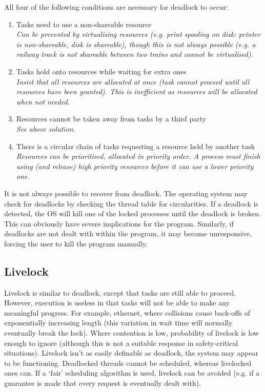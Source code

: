 \documentclass[a4paper,oneside]{report}
\begin{document}
    	\noindent All four of the following conditions are necessary for deadlock to occur: 
    	\begin{enumerate}
    		\item Tasks need to use a non-shareable resource\\ 
    			  \emph{Can be prevented by virtualising resources (e.g. print spooling on disk: printer is non-shareable, disk is shareable), though this is not always possible (e.g. a railway track is not shareable between two trains and cannot be virtualised).}
    		\item Tasks hold onto resources while waiting for extra ones\\
    			  \emph{Insist that all resources are allocated at once (task cannot proceed until all resources have been granted). This is inefficient as resources will be allocated when not needed.}
    		\item Resources cannot be taken away from tasks by a third party\\
    			  \emph{See above solution.}
    		\item There is a circular chain of tasks requesting a resource held by another task\\
    			  \emph{Resources can be prioritised, allocated in priority order. A process must finish using (and release) high priority resources before it can use a lower priority one.}
    	\end{enumerate}
    	
    	It is not always possible to recover from deadlock. The operating system may check for deadlocks by checking the thread table for circularities. If a deadlock is detected, the OS will kill one of the locked processes until the deadlock is broken. This can obviously have severe implications for the program. Similarly, if deadlocks are not dealt with within the program, it may become unresponsive, forcing the user to kill the program manually.
    	
    	\subsection{Livelock}
    	Livelock is similar to deadlock, except that tasks are still able to proceed. However, execution is useless in that tasks will not be able to make any meaningful progress. For example, ethernet, where collisions cause back-offs of exponentially increasing length (this variation in wait time will normally eventually break the lock). Where contention is low, probability of livelock is low enough to ignore (although this is not a suitable response in safety-critical situations). Livelock isn't as easily definable as deadlock, the system may appear to be functioning. Deadlocked threads cannot be scheduled, whereas livelocked ones can. If a `fair' scheduling algorithm is used, livelock can be avoided (e.g. if a guarantee is made that every request is eventually dealt with). 
    	
\end{document}
